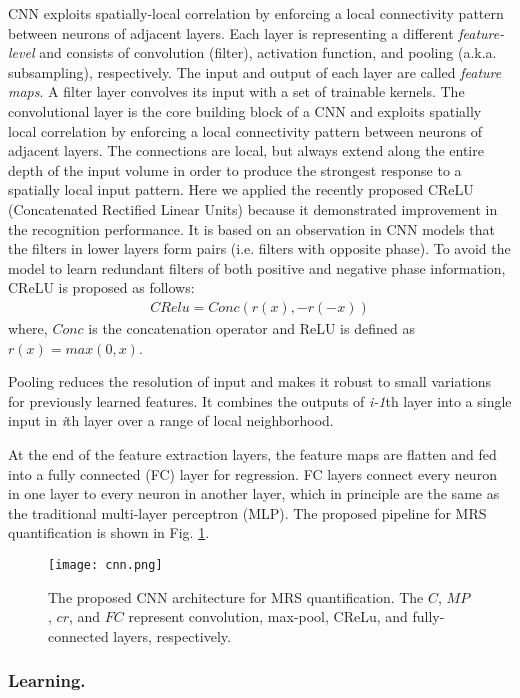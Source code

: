 \documentclass{llncs}
\begin{document}
CNN exploits spatially-local correlation by enforcing a local connectivity pattern between neurons of adjacent layers. Each layer is representing a different \emph{feature-level} and consists of convolution (filter), activation function, and pooling (a.k.a. subsampling), respectively. The input and output of each layer are called \emph{feature maps}. A filter layer convolves its input with a set of trainable kernels. The convolutional layer is the core building block of a CNN and exploits spatially local correlation by enforcing a local connectivity pattern between neurons of adjacent layers. The connections are local, but always extend along the entire depth of the input volume in order to produce the strongest response to a spatially local input pattern. 
Here we applied the recently proposed CReLU (Concatenated Rectified Linear Units) \cite{crelu} because it demonstrated improvement in the recognition performance. It is based on an observation in CNN models that the filters in lower layers form pairs (i.e. filters with opposite phase). To avoid the model to learn redundant filters of both positive and negative phase information, CReLU is proposed as follows:
\begin{eqnarray}
CRelu = Conc (r(x), -r(-x))
\end{eqnarray}
where, $Conc$ is the concatenation operator and ReLU is defined as $r(x)=max(0,x)$.

Pooling reduces the resolution of input and makes it robust to small variations for previously learned features. It combines the outputs of \emph{i-1}th layer into a single input in \emph{i}th layer over a range of local neighborhood. 

At the end of the feature extraction layers, the feature maps are flatten and fed into a fully connected (FC) layer for regression. FC layers connect every neuron in one layer to every neuron in another layer, which in principle are the same as the traditional multi-layer perceptron (MLP). The proposed pipeline for MRS quantification is shown in Fig. \ref{figCNN}.
\begin{figure}[t!]
\texttt{[image: cnn.png]}
\caption{The proposed CNN architecture for MRS quantification. The $C$, $MP$, $cr$, and $FC$ represent convolution, max-pool, CReLu, and fully-connected layers, respectively.}
\label{figCNN}
\end{figure}

\subsubsection{Learning.}
\end{document}
